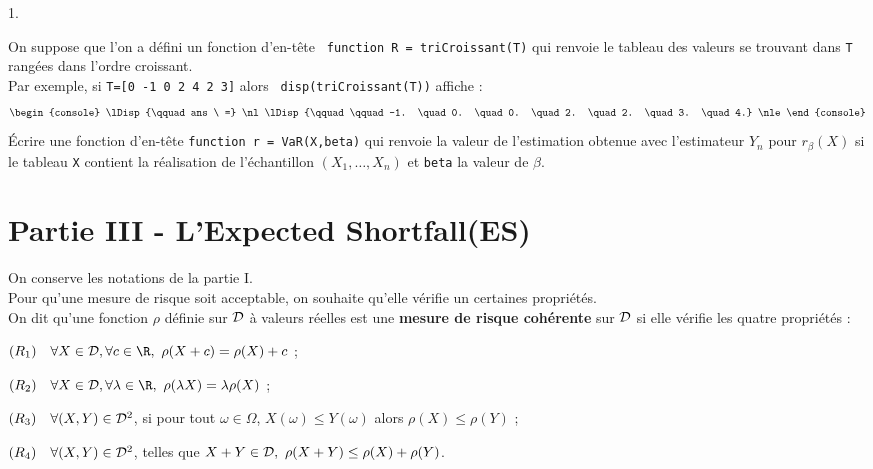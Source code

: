 \documentclass[11pt]{article}%
\begin{document}
\begin{noliste}{1.}
  \item On suppose que l'on a défini un fonction d'en-tête {\tt 
  function R = triCroissant(T)} qui renvoie le tableau des valeurs 
  se trouvant dans {\tt T} rangées dans l'ordre croissant.\\ 
  Par exemple, si {\tt T=[0 -1 0 2 4 2 3]} alors {\tt 
  disp(triCroissant(T))} affiche :
  \[
  \begin{console}
    \lDisp{\qquad ans \ =} \nl %
    \lDisp{\qquad \qquad -1. \quad 0. \quad 0. \quad 2. \quad 2. \quad 
    3. \quad 4.} \nle %
  \end{console}
  \]
  Écrire une fonction \Scilab{} d'en-tête {\tt function r = 
  VaR(X,beta)} qui renvoie la valeur de l'estimation obtenue avec 
  l'estimateur $Y_n$ pour $r_\beta(X)$ si le tableau {\tt X} 
  contient la réalisation de l'échantillon $(X_1, \ldots, X_n)$ et 
  {\tt beta} la valeur de $\beta$. 
  
  
\end{noliste}






\section*{Partie III - L'\og Expected Shortfall\fg (ES)}
\noindent
On conserve les notations de la partie I.\\
Pour qu'une mesure de risque soit acceptable, on souhaite qu'elle 
vérifie un certaines propriétés.\\
On dit qu'une fonction $\rho$ définie sur ${\cal D}$ à valeurs 
réelles est une {\bf mesure de risque cohérente} sur ${\cal D}$ 
si elle vérifie les quatre propriétés :
\begin{noliste}{}
  \item $(R_1) \quad \forall X \in {\cal D}, \forall c \in \R, \
  \rho(X+c)=\rho(X)+c$ ;
  
  \item $(R_2) \quad \forall X \in {\cal D}, \forall \lambda \in 
  \R, \ \rho(\lambda X)=\lambda \rho(X)$ ;
  
  \item $(R_3) \quad \forall(X,Y) \in {\cal D}^2$, si pour tout 
  $\omega \in \Omega$, $X(\omega) \leq Y(\omega)$ alors $\rho(X) 
  \leq \rho(Y)$ ;
  
  \item $(R_4) \quad \forall(X,Y) \in {\cal D}^2$, telles que $X+Y 
  \in {\cal D}, \ \rho(X+Y) \leq \rho(X)+\rho(Y)$.
\end{noliste}
\end{document}

